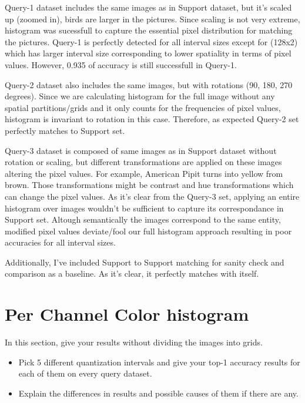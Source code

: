 \documentclass[12pt]{article}
\begin{document}
\vspace{1cm}


Query-1 dataset includes the same images as in Support dataset, but it's scaled up (zoomed in), 
birds are larger in the pictures.
Since scaling is not very extreme, histogram was sucessfull to capture the essential
pixel distribution for matching the pictures. Query-1 is perfectly detected for all interval sizes 
except for (128x2) which has larger interval size corresponding to lower spatiality 
in terms of pixel values. However, 0.935 of accuracy is still successfull in Query-1.

Query-2 dataset also includes the same images, but with rotations (90, 180, 270 degrees).
Since we are calculating histogram for the full image without any spatial partitions/grids
and it only counts for the frequencies of pixel values, histogram is invariant to rotation in this case.
Therefore, as expected Query-2 set perfectly matches to Support set.

Query-3 dataset is composed of same images as in Support dataset without rotation or scaling,
but different transformations are applied on these images altering the pixel values. 
For example, American Pipit turns into yellow from brown. Those transformations might 
be contrast and hue transformations which can change the pixel values. 
As it's clear from the Query-3 set, applying an entire histogram over images wouldn't be sufficient 
to capture its correspondance in Support set. Altough semantically the images correspond to the 
same  entity, modified pixel values deviate/fool our full histogram approach resulting in poor accuracies
for all interval sizes.


Additionally, I've included Support to Support matching for 
sanity check and comparison as a baseline. As it's clear, it perfectly matches with itself.


\section{Per Channel Color histogram}
In this section, give your results without dividing the images into grids.

\begin{itemize}
\item Pick 5 different quantization intervals and give your top-1 accuracy results for each of them on every query dataset.
\item Explain the differences in results and possible causes of them if there are any.
\end{itemize}
\end{document}
